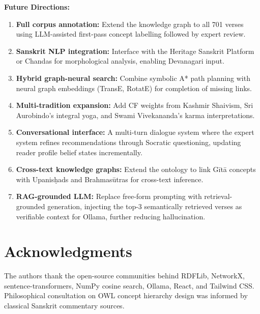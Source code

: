 \documentclass[conference]{IEEEtran}
\begin{document}
\textbf{Future Directions:}
\begin{enumerate}[leftmargin=*]
  \item \textbf{Full corpus annotation:} Extend the knowledge graph to all 701
        verses using LLM-assisted first-pass concept labelling followed by
        expert review.
  \item \textbf{Sanskrit NLP integration:} Interface with the Heritage Sanskrit
        Platform or Chandas for morphological analysis, enabling Devanagari input.
  \item \textbf{Hybrid graph-neural search:} Combine symbolic A* path planning with
        neural graph embeddings (TransE, RotatE) for completion of missing links.
  \item \textbf{Multi-tradition expansion:} Add CF weights from Kashmir Shaivism,
        Sri Aurobindo's integral yoga, and Swami Vivekananda's karma interpretations.
  \item \textbf{Conversational interface:} A multi-turn dialogue system where the
        expert system refines recommendations through Socratic questioning, updating
        reader profile belief states incrementally.
  \item \textbf{Cross-text knowledge graphs:} Extend the ontology to link G\={i}t\={a}
        concepts with Upanis\d{h}ads and Brahmas\={u}tras for cross-text inference.
  \item \textbf{RAG-grounded LLM:} Replace free-form prompting with
        retrieval-grounded generation, injecting the top-3 semantically retrieved
        verses as verifiable context for Ollama, further reducing hallucination.
\end{enumerate}

\section*{Acknowledgments}
The authors thank the open-source communities behind RDFLib, NetworkX,
sentence-transformers, NumPy cosine search, Ollama, React, and Tailwind CSS. Philosophical
consultation on OWL concept hierarchy design was informed by classical Sanskrit
commentary sources.
\end{document}
